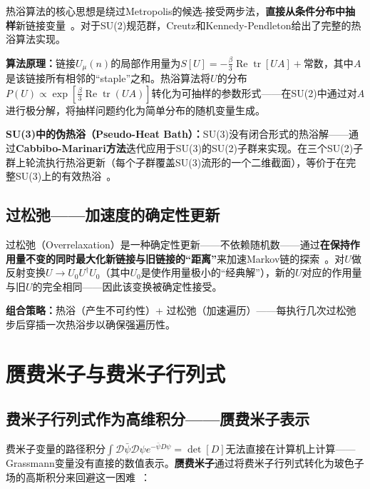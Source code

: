 \documentclass[12pt,a4paper]{ctexart}
\theoremstyle{definition}
\begin{document}
热浴算法的核心思想是绕过Metropolis的候选-接受两步法，\textbf{直接从条件分布中抽样}新链接变量~\cite{GattringerLang2010}。对于SU(2)规范群，Creutz和Kennedy-Pendleton给出了完整的热浴算法实现。

\textbf{算法原理：}链接$U_\mu(n)$的局部作用量为$S[U] = -\frac{\beta}{3} \operatorname{Re} \operatorname{tr}[U A] + \text{常数}$，其中$A$是该链接所有相邻的``staple''之和。热浴算法将$U$的分布$P(U) \propto \exp[\frac{\beta}{3}\operatorname{Re}\operatorname{tr}(UA)]$转化为可抽样的参数形式——在SU(2)中通过对$A$进行极分解，将抽样问题约化为简单分布的随机变量生成。

\textbf{SU(3)中的伪热浴（Pseudo-Heat Bath）：}SU(3)没有闭合形式的热浴解——通过\textbf{Cabbibo-Marinari方法}迭代应用于SU(3)的SU(2)子群来实现。在三个SU(2)子群上轮流执行热浴更新（每个子群覆盖SU(3)流形的一个二维截面），等价于在完整SU(3)上的有效热浴~\cite{GattringerLang2010}。

\subsection{过松弛——加速度的确定性更新}

过松弛（Overrelaxation）是一种确定性更新——不依赖随机数——通过\textbf{在保持作用量不变的同时最大化新链接与旧链接的``距离''}来加速Markov链的探索~\cite{GattringerLang2010}。对$U$做反射变换$U \to U_0 U^\dagger U_0$（其中$U_0$是使作用量极小的``经典解''），新的$U$对应的作用量与旧$U$的完全相同——因此该变换被确定性接受。

\textbf{组合策略：}热浴（产生不可约性）+ 过松弛（加速遍历）——每执行几次过松弛步后穿插一次热浴步以确保强遍历性。

\section{赝费米子与费米子行列式}

\subsection{费米子行列式作为高维积分——赝费米子表示}

费米子变量的路径积分$\int \mathcal{D}\bar\psi\mathcal{D}\psi e^{-\bar\psi D\psi} = \det[D]$无法直接在计算机上计算——Grassmann变量没有直接的数值表示。\textbf{赝费米子}通过将费米子行列式转化为玻色子场的高斯积分来回避这一困难~\cite{GattringerLang2010}：
\end{document}
